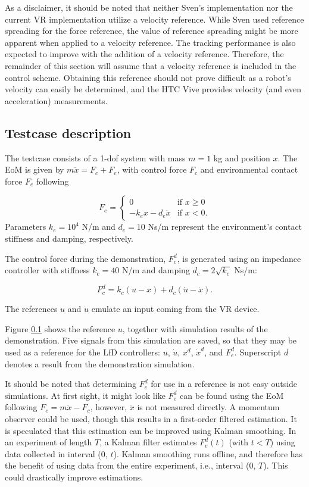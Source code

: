 \documentclass[11pt]{report}
\numberwithin{equation}{section}        %
\numberwithin{figure}{section}          %
\numberwithin{table}{section}           %
\begin{document}
  As a disclaimer, it should be noted that neither Sven's implementation nor the current VR implementation utilize a velocity reference. While Sven used reference spreading for the force reference, the value of reference spreading might be more apparent when applied to a velocity reference. The tracking performance is also expected to improve with the addition of a velocity reference. Therefore, the remainder of this section will assume that a velocity reference is included in the control scheme. Obtaining this reference should not prove difficult as a robot's velocity can easily be determined, and the HTC Vive provides velocity (and even acceleration) measurements.

  \subsection{Testcase description}
  The testcase consists of a 1-dof system with mass $m=1$ kg and position $x$. The EoM is given by $m\ddot{x}=F_c+F_e$, with control force $F_c$ and environmental contact force $F_e$ following

  $$F_e=\begin{cases}
    0 & \text{if } x\geq 0\\
    -k_e x-d_e \dot{x}               & \text{if } x<0.
  \end{cases}$$
  Parameters $k_e=10^4$ N/m and $d_e=10$ Ns/m represent the environment's contact stiffness and damping, respectively.

  The control force during the demonstration, $F_c^d$, is generated using an impedance controller with stiffness $k_c=40$ N/m and damping $d_c=2\sqrt{k_c}$ Ns/m:

  $$ F_c^d = k_c(u-x)+d_c(\dot{u}-\dot{x}).$$

  The references $u$ and $\dot{u}$ emulate an input coming from the VR device.

  Figure \ref{} shows the reference $u$, together with simulation results of the demonstration. Five signals from this simulation are saved, so that they may be used as a reference for the LfD controllers: $u$, $\dot{u}$, $x^d$, $\dot{x}^d$, and $F_e^d$. Superscript $d$ denotes a result from the demonstration simulation.

  It should be noted that determining $F_e^d$ for use in a reference is not easy outside simulations. At first sight, it might look like $F_e^d$ can be found using the EoM following $F_e = m\ddot{x}-F_c$, however, $\ddot{x}$ is not measured directly. A momentum observer could be used, though this results in a first-order filtered estimation. It is speculated that this estimation can be improved using Kalman smoothing. In an experiment of length $T$, a Kalman filter estimates $F_e^d(t)$ (with $t<T$) using data collected in interval ($0$, $t$). Kalman smoothing runs offline, and therefore has the benefit of using data from the entire experiment, i.e., interval ($0$, $T$). This could drastically improve estimations. 
\end{document}
